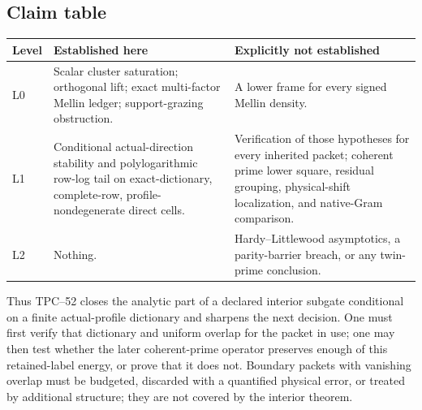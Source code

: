 \subsection{Claim table}

\begin{center}
\small
\begin{tabular}{@{}
 >{\raggedright\arraybackslash}p{}
 >{\raggedright\arraybackslash}p{}
 >{\raggedright\arraybackslash}p{}@{}}
\toprule
Level & Established here & Explicitly not established\\
\midrule
L0 & Scalar cluster saturation; orthogonal lift; exact multi-factor
Mellin ledger; support-grazing obstruction. & A lower frame for every
signed Mellin density.\\
L1 & Conditional actual-direction stability and polylogarithmic row-log
tail on exact-dictionary, complete-row, profile-nondegenerate direct cells.
& Verification of those hypotheses for every inherited packet; coherent
prime lower square, residual grouping, physical-shift localization, and
native-Gram comparison.\\
L2 & Nothing. & Hardy--Littlewood asymptotics, a parity-barrier breach,
or any twin-prime conclusion.\\
\bottomrule
\end{tabular}
\end{center}

Thus TPC--52 closes the analytic part of a declared interior subgate
conditional on a finite actual-profile dictionary and sharpens the next
decision.  One must first verify that dictionary and uniform overlap for the
packet in use; one may then test whether the later coherent-prime operator
preserves enough of this retained-label energy, or prove that it does
not.  Boundary packets with vanishing overlap must be budgeted,
discarded with a quantified physical error, or treated by additional
structure; they are not covered by the interior theorem.
